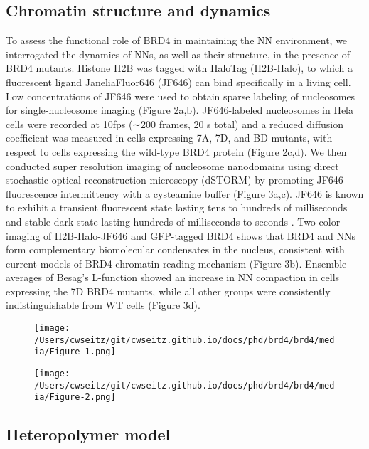 \subsection{Chromatin structure and dynamics}

To assess the functional role of BRD4 in maintaining the NN environment, we interrogated the dynamics of NNs, as well as their structure, in the presence of BRD4 mutants. Histone H2B was tagged with HaloTag \parencite{Los2008} (H2B-Halo), to which a fluorescent ligand JaneliaFluor646 (JF646) can bind speciﬁcally in a living cell. Low concentrations of JF646 were used to obtain sparse labeling of nucleosomes for single-nucleosome imaging (Figure 2a,b). JF646-labeled nucleosomes in Hela cells were recorded at 10fps (∼200 frames, 20 s total) and a reduced diffusion coefficient was measured in cells expressing 7A, 7D, and BD mutants, with respect to cells expressing the wild-type BRD4 protein (Figure 2c,d). We then conducted super resolution imaging of nucleosome nanodomains using direct stochastic optical reconstruction microscopy (dSTORM) by promoting JF646 fluorescence intermittency with a cysteamine buffer (Figure 3a,c). JF646 is known to exhibit a transient fluorescent state lasting tens to hundreds of milliseconds and stable dark state lasting hundreds of milliseconds to seconds \parencite{Grimm2015}. Two color imaging of H2B-Halo-JF646 and GFP-tagged BRD4 shows that BRD4 and NNs form complementary biomolecular condensates in the nucleus, consistent with current models of BRD4 chromatin reading mechanism (Figure 3b). Ensemble averages of Besag’s L-function showed an increase in NN compaction in cells expressing the 7D BRD4 mutants, while all other groups were consistently indistinguishable from WT cells (Figure 3d).  

\begin{figure}[t]
\texttt{[image: /Users/cwseitz/git/cwseitz.github.io/docs/phd/brd4/brd4/media/Figure-1.png]}
\caption{}
\end{figure}

\begin{figure}[t]
\texttt{[image: /Users/cwseitz/git/cwseitz.github.io/docs/phd/brd4/brd4/media/Figure-2.png]}
\caption{}
\end{figure}

\subsection{Heteropolymer model}

